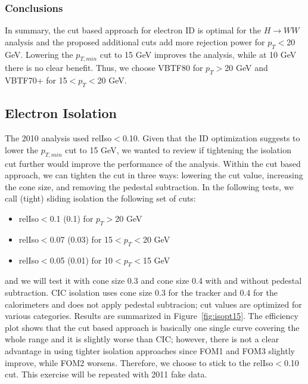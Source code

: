 \subsubsection{Conclusions}

In summary, the cut based approach for electron ID is optimal for the $H\rightarrow WW$ analysis and the proposed additional cuts add more rejection power 
for $p_T<$20 GeV. Lowering the $p_{T,min}$ cut to 15 GeV improves the analysis, while at 10 GeV there is no clear benefit. 
Thus, we choose VBTF80 for $p_T>$20 GeV and VBTF70+ for 15$<p_T<$20 GeV.

\subsection{Electron Isolation}

The 2010 analysis used relIso$<$0.10.
Given that the ID optimization suggests to lower the  $p_{T,min}$ cut to 15 GeV, we wanted to review if tightening the isolation cut further 
would improve the performance of the analysis.
Within the cut based approach, we can tighten the cut in three ways: lowering the cut value, increasing the cone size, and removing the pedestal subtraction.
In the following tests, we call (tight) sliding isolation the following set of cuts: 
\begin{itemize}
\item relIso$<$0.1 (0.1) for $p_T>$20 GeV
\item relIso$<$0.07 (0.03) for 15$<p_T<$20 GeV
\item relIso$<$0.05 (0.01) for 10$<p_T<$15 GeV
\end{itemize}
and we will test it with cone size 0.3 and cone size 0.4 with and without pedestal subtraction.
CIC isolation uses cone size 0.3 for the tracker and 0.4 for the calorimeters and does not apply pedestal subtracion; cut values are optimized for various categories.
Results are summarized in Figure~\ref{fig:isopt15}. 
The efficiency plot shows that the cut based approach is basically one single curve covering the whole range and it is slightly worse than CIC; 
however, there is not a clear advantage in using tighter isolation approaches since FOM1 and FOM3 slightly improve, while FOM2 worsens. 
Therefore, we choose to stick to the relIso$<$0.10 cut. This exercise will be repeated with 2011 fake data.

